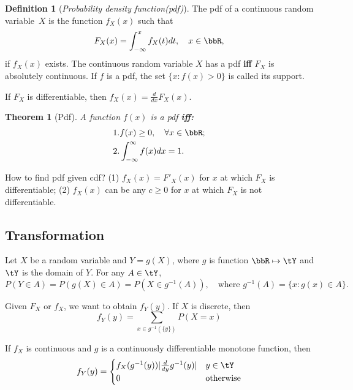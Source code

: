 \documentclass[11pt]{article}
\theoremstyle{plain}
\newtheorem{thm}{Theorem}[section]
\theoremstyle{definition}
\newtheorem{defn}{Definition}
\begin{document}
\begin{defn}[\textit{Probability density function(pdf)}] The pdf of a continuous random variable\ $X$ is the function $f_X(x)$ such that
\[ F_X(x) = \int_{-\infty}^x f_X(t) dt, \quad x \in \bbR, \]
if $f_X(x)$ exists.  The continuous random variable $X$ has a pdf \textbf{iff} $F_X$ is absolutely continuous. If $f$ is a pdf, the set $\{x: f(x) >0\}$ is called its support.
\end{defn}

If $F_X$ is differentiable, then $f_X(x) = \frac{d}{dx} F_X(x)$. 

\begin{thm}[Pdf]\label{thm:pdf} A function $f(x)$ is a pdf \textbf{iff:}
\begin{align}
	&1. f(x) \geq 0, \quad \forall x \in \bbR;\\
	&2. \int_{-\infty}^{\infty} f(x) dx = 1.
\end{align}
\end{thm}

How to find pdf given cdf? (1) $f_X(x) = F'_X(x)$ for $x$ at which $F_X$ is differentiable; (2) $f_X(x)$ can be any $c \geq 0$ for $x$ at which $F_X$ is not differentiable.

\subsection{Transformation}
Let $X$ be a random variable and $Y= g(X)$, where $g$ is function $\bbR \mapsto \tY$ and $\tY$ is the domain of $Y$. For any $A \in \tY$,
\[  P(Y \in A) = P(g(X) \in A) = P(X \in g^{-1}(A)), \quad \text{where } g^{-1}(A) = \{ x: g(x) \in A \}. \]

Given $F_X$ or $f_X$, we want to obtain $f_Y(y)$. 
If $X$ is discrete, then
\[ f_Y(y) = \sum_{x\in g^{-1}(\{y\}) } P(X =x)  \]

If $f_X$ is continuous and $g$ is a continuously differentiable monotone function, then
\begin{align}
	f_Y(y) = \begin{cases}
		f_X(g^{-1}(y)) \vert \frac{d}{dy} g^{-1}(y)\vert & y \in \tY\\
		0 & \text{otherwise}
	\end{cases}
\end{align}
\end{document}
